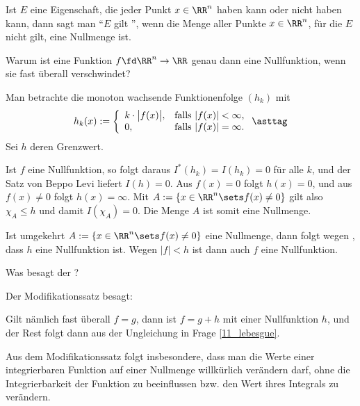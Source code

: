 \begin{antwort}
  Ist $E$ eine Eigenschaft, die jeder Punkt $x\in\RR^n$ haben kann 
  oder nicht haben kann, dann sagt man 
  "`$E$ gilt "', wenn die Menge aller Punkte 
  $x\in\RR^n$, für die $E$ nicht gilt, eine Nullmenge ist.  
  \AntEnd 
\end{antwort} 

\begin{frage}
  Warum ist eine Funktion $f\fd \RR^n\to\RR$ 
  genau dann eine Nullfunktion, wenn sie fast überall verschwindet?
\end{frage}

\begin{antwort}
  Man betrachte die monoton wachsende Funktionenfolge 
  $(h_k)$ mit 
  \[
  h_k (x) := \left\{ \begin{array}{ll} k\cdot \big| f(x) \big|, & 
      \text{falls $|f(x)| < \infty$,}\\
      0,& \text{falls $|f(x)| = \infty$}. \end{array}\right. 
  \asttag
  \]
  Sei $h$ deren Grenzwert. 

  Ist $f$ eine Nullfunktion, 
  so folgt daraus $I^*(h_k)=I(h_k)=0$ für alle 
  $k$, und der Satz von Beppo Levi liefert $I(h)=0$. 
  Aus $f(x)=0$ folgt $h(x)=0$, und aus $f(x)\not=0$ folgt $h(x)=\infty$. 
  Mit $A:= \{ x\in\RR^n \sets f(x)\not=0 \}$ gilt also 
  $\chi_A \le h$ und damit $I(\chi_A)=0$. Die Menge $A$ ist somit eine 
  Nullmenge. 

  Ist umgekehrt $A:= \{ x\in\RR^n \sets f(x)\not=0 \}$ eine Nullmenge, 
  dann folgt wegen {\astref}, dass $h$ eine Nullfunktion ist. Wegen 
  $|f|<h$ ist dann auch $f$ eine Nullfunktion. \AntEnd  
\end{antwort}


\begin{frage}\label{11_modisatz} 
  Was besagt der ?
\end{frage}

\begin{antwort}
  Der Modifikationssatz besagt:

  \medskip\noindent

  \medskip
  Gilt nämlich fast überall $f=g$, dann ist 
  $f=g+h$ mit einer Nullfunktion $h$, und der Rest folgt dann aus der 
  Ungleichung {\astref} in Frage \ref{11_lebesgue}. 

  Aus dem Modifikationssatz folgt insbesondere, 
  dass man die Werte einer integrierbaren 
  Funktion auf einer Nullmenge willkürlich verändern darf, ohne  
  die Integrierbarkeit der Funktion 
  zu beeinflussen bzw. den Wert ihres Integrals zu verändern.
  \AntEnd 
\end{antwort} 

